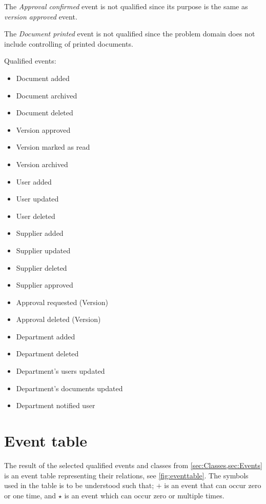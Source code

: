 The \textit{Approval confirmed} event is not qualified since its purpose is the same as \textit{version approved} event.

The \textit{Document printed} event is not qualified since the problem domain does not include controlling of printed documents.

Qualified events:
\begin{multicols}{2}
	\begin{itemize}
	\item Document added
	\item Document archived
	\item Document deleted
	\item Version approved
	\item Version marked as read
	\item Version archived
	\item User added
	\item User updated
	\item User deleted
	\item Supplier added
	\item Supplier updated
	\item Supplier deleted
	\item Supplier approved
	\item Approval requested (Version)
	\item Approval deleted (Version)
	\item Department added
	\item Department deleted
	\item Department's users updated
	\item Department's documents updated
	\item Department notified user
	\end{itemize}
\end{multicols}

\section{Event table}\label{sec:EventTable}
The result of the selected qualified events and classes from \cref{sec:Classes,sec:Events} is an event table representing their relations, see \cref{fig:eventtable}.
The symbols used in the table is to be understood such that; $+$ is an event that can occur zero or one time, and $\star$ is an event which can occur zero or multiple times.

